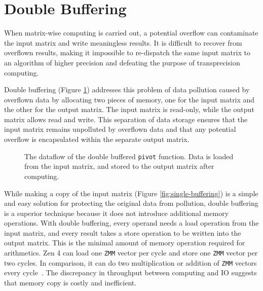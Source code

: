 \documentclass[logo,bsc,singlespacing,parskip]{infthesis}
\newcommand{\pivot}{\texttt{pivot}}
\newcommand{\zmm}{\texttt{ZMM}}
\begin{document}
\section{Double Buffering}

When matrix-wise computing is carried out, a potential overflow can contaminate the input matrix and write meaningless results. It is difficult to recover from overflown results, making it impossible to re-dispatch the same input matrix to an algorithm of higher precision and defeating the purpose of transprecision computing.

Double buffering (Figure \ref{fig:double-buffering}) addresses this problem of data pollution caused by overflown data by allocating two pieces of memory, one for the input matrix and the other for the output matrix. The input matrix is read-only, while the output matrix allows read and write. This separation of data storage ensures that the input matrix remains unpolluted by overflown data and that any potential overflow is encapsulated within the separate output matrix. 

\begin{figure}[H]
\centering
{}
\caption{The dataflow of the double buffered \pivot{}
function. Data is loaded from the input matrix, and stored to the output
matrix after computing.}
\label{fig:double-buffering}
\end{figure}


While making a copy of the input matrix (Figure \ref{fig:single-buffering}) is a simple and easy solution for protecting the original data from pollution, double buffering is a superior technique because it does not introduce additional memory operations. With double buffering, every operand needs a load operation from the input matrix, and every result takes a store operation to be written into the output matrix. This is the minimal amount of memory operation required for arithmetics. Zen 4 can load one \zmm{} vector per cycle and store one \zmm{} vector per two cycles. In comparison, it can do two multiplication or addition of \zmm{} vectors every cycle~\cite{Zen4Critique}. The discrepancy in throughput between computing and IO suggests that memory copy is costly and inefficient. 
\end{document}

